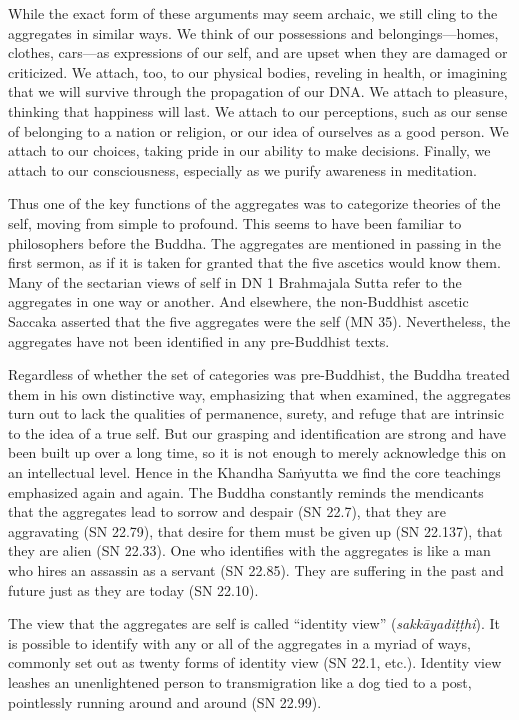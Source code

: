 \documentclass[12pt,openany]{book}%
\begin{document}
While the exact form of these arguments may seem archaic, we still cling to the aggregates in similar ways. We think of our possessions and belongings—homes, clothes, cars—as expressions of our self, and are upset when they are damaged or criticized. We attach, too, to our physical bodies, reveling in health, or imagining that we will survive through the propagation of our DNA. We attach to pleasure, thinking that happiness will last. We attach to our perceptions, such as our sense of belonging to a nation or religion, or our idea of ourselves as a good person. We attach to our choices, taking pride in our ability to make decisions. Finally, we attach to our consciousness, especially as we purify awareness in meditation.

Thus one of the key functions of the aggregates was to categorize theories of the self, moving from simple to profound. This seems to have been familiar to philosophers before the Buddha. The aggregates are mentioned in passing in the first sermon, as if it is taken for granted that the five ascetics would know them. Many of the sectarian views of self in DN 1 Brahmajala Sutta refer to the aggregates in one way or another. And elsewhere, the non-Buddhist ascetic Saccaka asserted that the five aggregates were the self (MN 35). Nevertheless, the aggregates have not been identified in any pre-Buddhist texts.

Regardless of whether the set of categories was pre-Buddhist, the Buddha treated them in his own distinctive way, emphasizing that when examined, the aggregates turn out to lack the qualities of permanence, surety, and refuge that are intrinsic to the idea of a true self. But our grasping and identification are strong and have been built up over a long time, so it is not enough to merely acknowledge this on an intellectual level. Hence in the Khandha \textsanskrit{Saṁyutta} we find the core teachings emphasized again and again. The Buddha constantly reminds the mendicants that the aggregates lead to sorrow and despair (SN 22.7), that they are aggravating (SN 22.79), that desire for them must be given up (SN 22.137), that they are alien (SN 22.33). One who identifies with the aggregates is like a man who hires an assassin as a servant (SN 22.85). They are suffering in the past and future just as they are today (SN 22.10).

The view that the aggregates are self is called “identity view” (\textit{\textsanskrit{sakkāyadiṭṭhi}}). It is possible to identify with any or all of the aggregates in a myriad of ways, commonly set out as twenty forms of identity view (SN 22.1, etc.). Identity view leashes an unenlightened person to transmigration like a dog tied to a post, pointlessly running around and around (SN 22.99).
\end{document}
